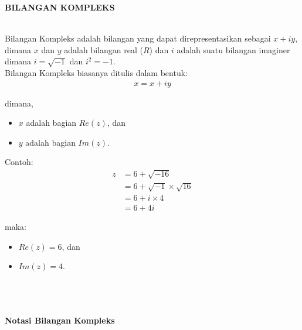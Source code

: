 \documentclass{article}
\begin{document}
\begin{center}
    \textbf{BILANGAN KOMPLEKS}
\end{center}
\leavevmode\\

Bilangan Kompleks adalah bilangan yang dapat direpresentasikan sebagai \( x + iy \), dimana $x$ dan $y$ adalah bilangan real ($R$) dan $i$ adalah suatu bilangan imaginer dimana \( i = \sqrt{-1} \) dan \( i^2 = -1 \).\\

Bilangan Kompleks biasanya ditulis dalam bentuk:
\begin{align}
    x = x + iy
\end{align}

\>dimana,
\begin{itemize}
    \item $x$ adalah bagian $Re(z)$, dan
    \item $y$ adalah bagian $Im(z)$. \\
\end{itemize}

Contoh:
\begin{align}
    z & = 6 + \sqrt{-16}
    \nonumber                            \\
      & = 6 + \sqrt{-1} \times \sqrt{16}
    \nonumber                            \\
      & = 6 + i \times 4
    \nonumber                            \\
      & = 6 + 4i
\end{align}

maka:
\begin{itemize}
    \item $Re(z) = 6$, dan
    \item $Im(z) = 4$. \\ \\ \\ \\
\end{itemize}

\newpage
\begin{center}
    \textbf{Notasi Bilangan Kompleks}
\end{center}
\leavevmode\\

\\ \\
\end{document}
